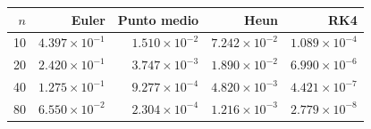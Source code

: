 \begin{tabular}{rrrrr}\toprule
$n$ & Euler & Punto medio & Heun & RK4\\\midrule
10 & $4.397\times10^{-1}$ & $1.510\times10^{-2}$ & $7.242\times10^{-2}$ & $1.089\times10^{-4}$\\
20 & $2.420\times10^{-1}$ & $3.747\times10^{-3}$ & $1.890\times10^{-2}$ & $6.990\times10^{-6}$\\
40 & $1.275\times10^{-1}$ & $9.277\times10^{-4}$ & $4.820\times10^{-3}$ & $4.421\times10^{-7}$\\
80 & $6.550\times10^{-2}$ & $2.304\times10^{-4}$ & $1.216\times10^{-3}$ & $2.779\times10^{-8}$\\
\bottomrule\end{tabular}